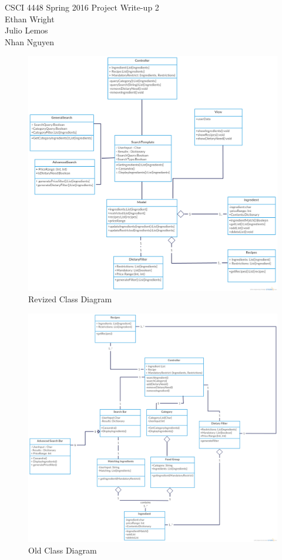 \documentclass[12pt]{article}
\begin{document}
CSCI 4448 Spring 2016 \hfill Project Write-up 2\\
Ethan Wright \\
Julio Lemos \\
Nhan Nguyen \\

\hrulefill
\begin{figure}
  \includegraphics[width=\linewidth]{revized_class.png}
  \caption{Revized Class Diagram}
  \label{fig: usecases}
\end{figure}

\begin{center}
  \begin{figure}
    \includegraphics[width=\linewidth]{class1.png}
    \caption{Old Class Diagram}
    \label{fig: class}
  \end{figure}
\end{center}
\end{document}
